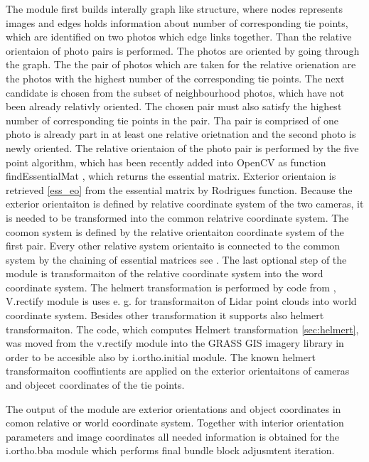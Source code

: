 \documentclass[a4paper,12pt]{report}
\begin{document}
\begin{itemize}
The module first builds interally graph like structure, where nodes represents images and edges holds information 
about number of corresponding tie points, which are identified on two photos which edge links together.
Than the relative orientaion of photo pairs is performed. The photos are oriented by going through the graph. 
The the pair of photos which are taken for the relative orienation are the photos with the highest number of the corresponding tie points. 
The next candidate is chosen from the subset of neighbourhood photos, which have not been already relativly oriented. The chosen pair 
must also satisfy the highest number of corresponding tie points in the pair. Tha pair is comprised of one photo is already 
part in at least one relative orietnation and the second photo is newly oriented. The relative orientaion of the photo 
pair is performed by  the five point algorithm, which has been recently added into OpenCV as function findEssentialMat \cite{calib_manual2013opencv},
which returns the essential matrix. Exterior orientaion is retrieved \ref{ess_eo} from the essential matrix by Rodrigues \cite{calib_manual2013opencv} 
function. Because the exterior orientaiton is defined by relative coordinate system of the two cameras, it is needed to be transformed into 
the common relatrive coordinate system. The coomon system is defined by the relative orientaiton coordinate system of the first pair.
Every other relative system orientaito is connected to the common system by the chaining of essential matrices see \label{sec:ess_chain}.
The last optional step of the module is transformaiton of the relative coordinate system into the word coordinate system. The helmert 
transformation is performed by code from \cite{v.rectify}, V.rectify module is uses e. g. for transformaiton of Lidar point clouds 
into world coordinate system. Besides other transformation it supports also helmert transformaiton. The code, which computes Helmert 
transformation \ref{sec:helmert}, was moved from the v.rectify module into the GRASS GIS imagery library in order to be accesible also  by i.ortho.initial
module. The known helmert transformaiton cooffintients are applied on the exterior orientaitons of cameras and objecet coordinates of the tie points.

The output of the module are exterior orientations and object coordinates in comon relative or world coordinate system. Together with interior
orientation parameters and image coordinates all needed information is obtained  for the i.ortho.bba module which performs final bundle block adjusmtent 
iteration.  


\end{itemize}
\end{document}
